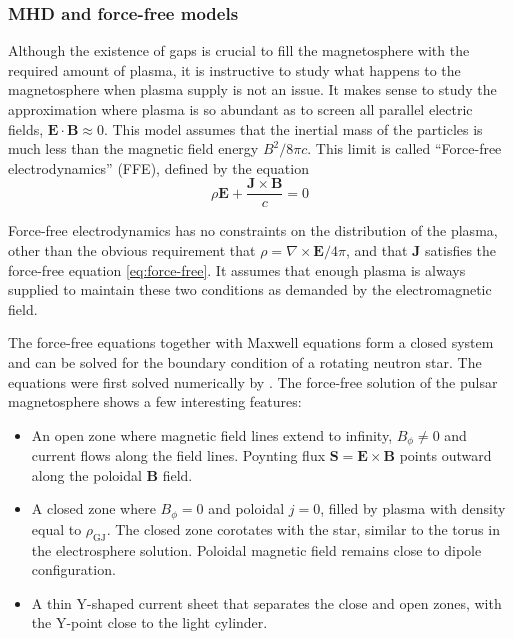 \subsubsection{MHD and force-free models}
\label{sec:mhd-force-free}

Although the existence of gaps is crucial to fill the magnetosphere with the
required amount of plasma, it is instructive to study what happens to the
magnetosphere when plasma supply is not an issue. It makes sense to study the
approximation where plasma is so abundant as to screen all parallel electric
fields, $\mathbf{E}\cdot \mathbf{B}\approx 0$. This model assumes that the
inertial mass of the particles is much less than the magnetic field energy
$B^{2}/8\pi c$. This limit is called ``Force-free electrodynamics'' (FFE),
defined by the equation
\begin{equation}
  \label{eq:force-free}
  \rho \mathbf{E} + \frac{\mathbf{J}\times \mathbf{B}}{c} = 0
\end{equation}

Force-free electrodynamics has no constraints on the distribution of the plasma,
other than the obvious requirement that $\rho = \nabla\times \mathbf{E} / 4\pi$,
and that $\mathbf{J}$ satisfies the force-free equation \eqref{eq:force-free}.
It assumes that enough plasma is always supplied to maintain these two
conditions as demanded by the electromagnetic field.

The force-free equations together with Maxwell equations form a closed system
and can be solved for the boundary condition of a rotating neutron star. The
equations were first solved numerically by \citet{contopoulos_axisymmetric_1999}
\citetext{see also e.g.\ \citealp{goodwin_idealized_2004};
  \citealp{gruzinov_power_2005}; \citealp{timokhin_force-free_2006};
  \citealp{parfrey_introducing_2012}}. The force-free solution of the pulsar
magnetosphere shows a few interesting features:
\begin{itemize}
\item An open zone where magnetic field lines extend to infinity, $B_{\phi}\neq
  0$ and current flows along the field lines. Poynting flux $\mathbf{S} =
  \mathbf{E}\times \mathbf{B}$ points outward along the poloidal $\mathbf{B}$
  field.
\item A closed zone where $B_{\phi} = 0$ and poloidal $j=0$, filled by plasma
  with density equal to $\rho_\mathrm{GJ}$. The closed zone corotates with the
  star, similar to the torus in the electrosphere solution. Poloidal magnetic
  field remains close to dipole configuration.
\item A thin Y-shaped current sheet that separates the close and open zones,
  with the Y-point close to the light cylinder.
\end{itemize}

